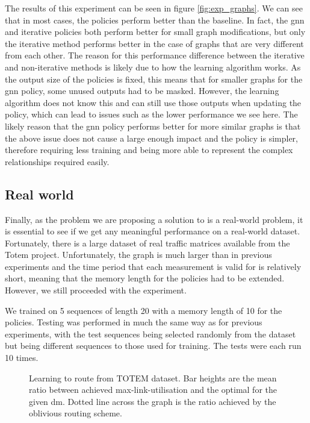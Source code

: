 The results of this experiment can be seen in figure \ref{fig:exp_graphs}. We can see that in most cases, the policies perform better than the baseline. In fact, the \ac{gnn} and iterative policies both perform better for small graph modifications, but only the iterative method performs better in the case of graphs that are very different from each other. The reason for this performance difference between the iterative and non-iterative methods is likely due to how the learning algorithm works. As the output size of the policies is fixed, this means that for smaller graphs for the \ac{gnn} policy, some unused outputs had to be masked. However, the learning algorithm does not know this and can still use those outputs when updating the policy, which can lead to issues such as the lower performance we see here. The likely reason that the \ac{gnn} policy performs better for more similar graphs is that the above issue does not cause a large enough impact and the policy is simpler, therefore requiring less training and being more able to represent the complex relationships required easily.

\subsection{Real world}
Finally, as the problem we are proposing a solution to is a real-world problem, it is essential to see if we get any meaningful performance on a real-world dataset. Fortunately, there is a large dataset of real traffic matrices available from the Totem\cite{uhlig2006providing} project. Unfortunately, the graph is much larger than in previous experiments and the time period that each measurement is valid for is relatively short, meaning that the memory length for the policies had to be extended. However, we still proceeded with the experiment.

We trained on 5 sequences of length 20 with a memory length of 10 for the policies. Testing was performed in much the same way as for previous experiments, with the test sequences being selected randomly from the dataset but being different sequences to those used for training. The tests were each run 10 times.

\begin{figure}
    \centering
    
    \caption{Learning to route from TOTEM dataset. Bar heights are the mean ratio between achieved max-link-utilisation and the optimal for the given \ac{dm}. Dotted line across the graph is the ratio achieved by the oblivious routing scheme.}
    \label{fig:exp_real}
\end{figure}

